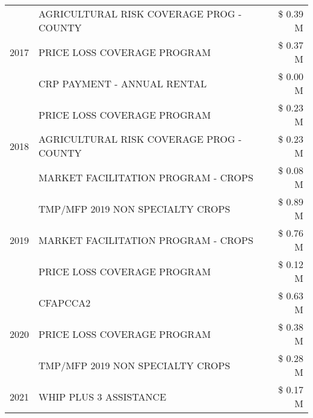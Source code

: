 \begin{tabular}{llr}
\cline{1-3}
\multirow[t]{3}{*}{2017} & AGRICULTURAL RISK COVERAGE PROG - COUNTY & \$ 0.39 M \\
 & PRICE LOSS COVERAGE PROGRAM & \$ 0.37 M \\
 & CRP PAYMENT - ANNUAL RENTAL & \$ 0.00 M \\
\cline{1-3}
\multirow[t]{3}{*}{2018} & PRICE LOSS COVERAGE PROGRAM & \$ 0.23 M \\
 & AGRICULTURAL RISK COVERAGE PROG - COUNTY & \$ 0.23 M \\
 & MARKET FACILITATION PROGRAM - CROPS & \$ 0.08 M \\
\cline{1-3}
\multirow[t]{3}{*}{2019} & TMP/MFP 2019 NON SPECIALTY CROPS & \$ 0.89 M \\
 & MARKET FACILITATION PROGRAM - CROPS & \$ 0.76 M \\
 & PRICE LOSS COVERAGE PROGRAM & \$ 0.12 M \\
\cline{1-3}
\multirow[t]{3}{*}{2020} & CFAPCCA2 & \$ 0.63 M \\
 & PRICE LOSS COVERAGE PROGRAM & \$ 0.38 M \\
 & TMP/MFP 2019 NON SPECIALTY CROPS & \$ 0.28 M \\
\cline{1-3}
2021 & WHIP PLUS 3 ASSISTANCE & \$ 0.17 M \\
\cline{1-3}
\bottomrule
\end{tabular}
